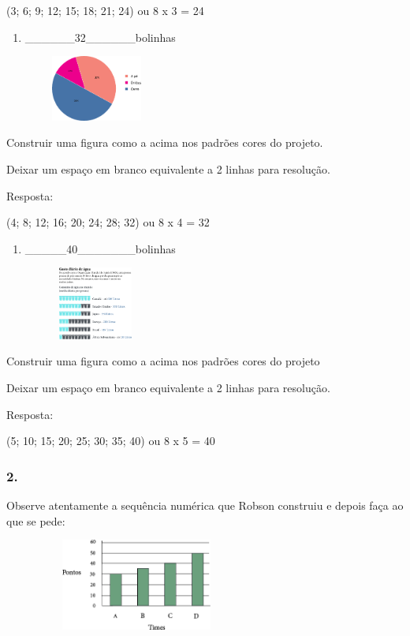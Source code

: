 (3; 6; 9; 12; 15; 18; 21; 24) ou 8 x 3 = 24

\begin{enumerate}
\def\labelenumi{\alph{enumi})}
\item
  \_\_\_\_\_\_32\_\_\_\_\_\_bolinhas
\end{enumerate}

\includegraphics[width=2.38354in,height=0.85007in]{media/image41.png}

Construir uma figura como a acima nos padrões cores do projeto.

Deixar um espaço em branco equivalente a 2 linhas para resolução.

Resposta:

(4; 8; 12; 16; 20; 24; 28; 32) ou 8 x 4 = 32

\begin{enumerate}
\def\labelenumi{\alph{enumi})}
\item
  \_\_\_\_\_40\_\_\_\_\_\_\_bolinhas
\end{enumerate}

\includegraphics[width=2.35854in,height=0.94175in]{media/image42.png}

Construir uma figura como a acima nos padrões cores do projeto

Deixar um espaço em branco equivalente a 2 linhas para resolução.

Resposta:

(5; 10; 15; 20; 25; 30; 35; 40) ou 8 x 5 = 40

\subsubsection{2.}\label{section-27}

Observe atentamente a sequência numérica que Robson construiu e depois
faça ao que se pede:

\includegraphics[width=3.44197in,height=1.18344in]{media/image43.png}

